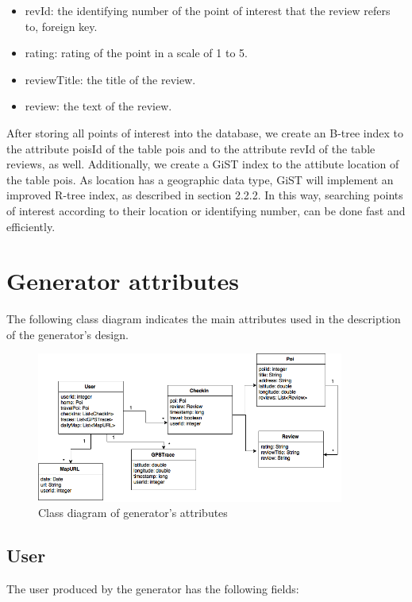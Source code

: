 \begin{itemize}
 \item revId: the identifying number of the point of interest that the review refers to, foreign key.
 \item rating: rating of the point in a scale of 1 to 5.
 \item reviewTitle: the title of the review.
 \item review: the text of the review.
\end{itemize}

After storing all points of interest into the database, we create an B-tree index to the attribute poisId of the table pois and to the attribute revId of the table reviews, 
as well. Additionally, we create a GiST index to the attibute location of the table pois. As location has a geographic data type, GiST will implement an 
improved R-tree index, as described in section 2.2.2. In this way, searching points of interest according to their location or identifying number, can be done 
fast and efficiently.

\section{Generator attributes}

The following class diagram indicates the main attributes used in the description of the generator's design.

\begin{figure}[H]
  \centering
  \includegraphics[width=0.9\textwidth]{figures/class_diagram.png}
  \caption{Class diagram of generator's attributes}
\end{figure}

\subsection{User}

The user produced by the generator has the following fields:

